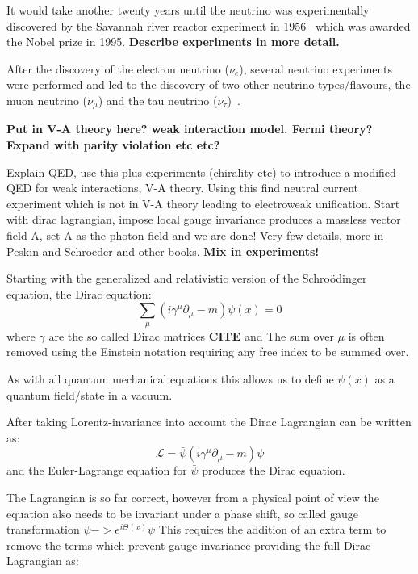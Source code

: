 It would take another twenty years until the neutrino was experimentally discovered by the Savannah river reactor experiment in 1956~\cite{6Reines} which was awarded the Nobel prize in 1995. \textbf{Describe experiments in more detail.}

After the discovery of the electron neutrino ($\nu_e$), several neutrino experiments were performed and led to the discovery of two other neutrino types/flavours, the muon neutrino ($\nu_\mu$) and the tau neutrino ($\nu_\tau$)~\cite{7Danby, 8Perl, Fix1}.

\textbf{Put in V-A theory here? weak interaction model. Fermi theory?}
\textbf{Expand with parity violation etc etc?}

Explain QED, use this plus experiments (chirality etc) to introduce a modified QED for weak interactions, V-A theory. Using this find neutral current experiment which is not in V-A theory leading to electroweak unification.
Start with dirac lagrangian, impose local gauge invariance produces a massless vector field A, set A as the photon field and we are done! 
Very few details, more in Peskin and Schroeder and other books.
\textbf{Mix in experiments!}
\fi

Starting with the generalized and relativistic version of the Schro\"{o}dinger equation, the Dirac equation:
\begin{equation}
\sum_\mu (i\gamma^\mu \partial_\mu - m)\psi(x) = 0
\end{equation}
where $\gamma$ are the so called Dirac matrices \textbf{CITE} and 
The sum over $\mu$ is often removed using the Einstein notation requiring any free index to be summed over.

As with all quantum mechanical equations this allows us to define $\psi(x)$ as a quantum field/state in a vacuum.

After taking Lorentz-invariance into account the Dirac Lagrangian can be written as:
\begin{equation}
\mathcal{L} = \bar{\psi}(i\gamma^\mu\partial_\mu-m)\psi
\end{equation}
and the Euler-Lagrange equation for $\bar{\psi}$ produces the Dirac equation.

The Lagrangian is so far correct, however from a physical point of view the equation also needs to be invariant under a phase shift, so called gauge transformation $\psi -> e^{i\Theta(x)}\psi$ This requires the addition of an extra term to remove the terms which prevent gauge invariance providing the full Dirac Lagrangian as:

